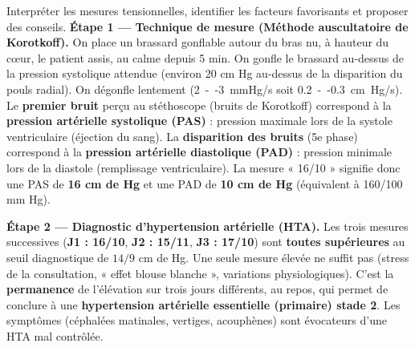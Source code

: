 \documentclass[11pt]{article}
\begin{document}
\begin{exoresolu}
Interpréter les mesures tensionnelles, identifier les facteurs favorisants et proposer des conseils.
\tcblower
\textbf{Étape 1 — Technique de mesure (Méthode auscultatoire de Korotkoff).} On place un brassard gonflable autour du bras nu, à hauteur du cœur, le patient assis, au calme depuis 5 min. On gonfle le brassard au-dessus de la pression systolique attendue (environ 20 cm Hg au-dessus de la disparition du pouls radial). On dégonfle lentement (\SI{2}{--}\SI{3}{mmHg/s} soit \SI{0,2}{--}\SI{0,3}{cm Hg/s}). Le \textbf{premier bruit} perçu au stéthoscope (bruits de Korotkoff) correspond à la \textbf{pression artérielle systolique (PAS)} : pression maximale lors de la systole ventriculaire (éjection du sang). La \textbf{disparition des bruits} (5e phase) correspond à la \textbf{pression artérielle diastolique (PAD)} : pression minimale lors de la diastole (remplissage ventriculaire). La mesure « 16/10 » signifie donc une PAS de \textbf{16 cm de Hg} et une PAD de \textbf{10 cm de Hg} (équivalent à 160/100 mm Hg).

\textbf{Étape 2 — Diagnostic d'hypertension artérielle (HTA).} Les trois mesures successives (\textbf{J1 : 16/10}, \textbf{J2 : 15/11}, \textbf{J3 : 17/10}) sont \textbf{toutes supérieures} au seuil diagnostique de $14/9$ cm de Hg. Une seule mesure élevée ne suffit pas (stress de la consultation, « effet blouse blanche », variations physiologiques). C'est la \textbf{permanence} de l'élévation sur trois jours différents, au repos, qui permet de conclure à une \textbf{hypertension artérielle essentielle (primaire) stade 2}. Les symptômes (céphalées matinales, vertiges, acouphènes) sont évocateurs d'une HTA mal contrôlée.


\end{exoresolu}
\end{document}
